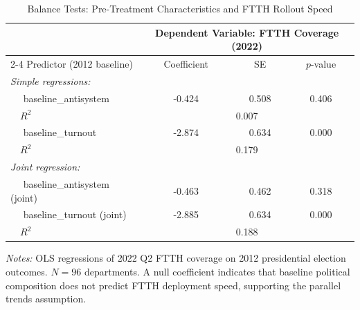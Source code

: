 \begin{table}[htbp]
\centering
\caption{Balance Tests: Pre-Treatment Characteristics and FTTH Rollout Speed}
\label{tab:balance}
\begin{tabular}{lccc}
\hline\hline
& \multicolumn{3}{c}{Dependent Variable: FTTH Coverage (2022)} \\
\cmidrule(lr){2-4}
Predictor (2012 baseline) & Coefficient & SE & $p$-value \\
\hline
\emph{Simple regressions:} & & & \\
~~ baseline_antisystem & -0.424 & 0.508 & 0.406 \\
~~\quad $R^2$ & \multicolumn{3}{c}{0.007} \\
~~ baseline_turnout & -2.874 & 0.634 & 0.000 \\
~~\quad $R^2$ & \multicolumn{3}{c}{0.179} \\
\emph{Joint regression:} & & & \\
~~ baseline_antisystem (joint) & -0.463 & 0.462 & 0.318 \\
~~ baseline_turnout (joint) & -2.885 & 0.634 & 0.000 \\
~~\quad $R^2$ & \multicolumn{3}{c}{0.188} \\
\hline
\hline\hline
\end{tabular}
\begin{minipage}{0.85\textwidth}
\vspace{0.3em}
\footnotesize \emph{Notes:} OLS regressions of 2022 Q2 FTTH coverage on 2012 presidential election outcomes. $N = 96$ departments. A null coefficient indicates that baseline political composition does not predict FTTH deployment speed, supporting the parallel trends assumption.
\end{minipage}
\end{table}
